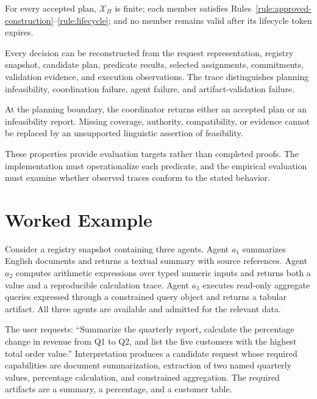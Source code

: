 \begin{property}
\label{prop:bounded-synthesis}
For every accepted plan, $\mathcal{X}_{\Pi}$ is finite; each member satisfies Rules~\ref{rule:approved-construction}--\ref{rule:lifecycle}; and no member remains valid after its lifecycle token expires.
\end{property}

\begin{property}[Traceability]
\label{prop:traceability}
Every decision can be reconstructed from the request representation, registry snapshot, candidate plan, predicate results, selected assignments, commitments, validation evidence, and execution observations. The trace distinguishes planning infeasibility, coordination failure, agent failure, and artifact-validation failure.
\end{property}

\begin{property}
\label{prop:explicit-refusal}
At the planning boundary, the coordinator returns either an accepted plan or an infeasibility report. Missing coverage, authority, compatibility, or evidence cannot be replaced by an unsupported linguistic assertion of feasibility.
\end{property}

These properties provide evaluation targets rather than completed proofs. The implementation must operationalize each predicate, and the empirical evaluation must examine whether observed traces conform to the stated behavior.

\section{Worked Example}

Consider a registry snapshot containing three agents. Agent $a_1$ summarizes English documents and returns a textual summary with source references. Agent $a_2$ computes arithmetic expressions over typed numeric inputs and returns both a value and a reproducible calculation trace. Agent $a_3$ executes read-only aggregate queries expressed through a constrained query object and returns a tabular artifact. All three agents are available and admitted for the relevant data.

The user requests: ``Summarize the quarterly report, calculate the percentage change in revenue from Q1 to Q2, and list the five customers with the highest total order value.'' Interpretation produces a candidate request whose required capabilities are document summarization, extraction of two named quarterly values, percentage calculation, and constrained aggregation. The required artifacts are a summary, a percentage, and a customer table.


